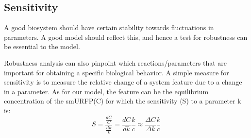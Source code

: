 \subsection{Sensitivity }
A good biosystem should have certain stability towards fluctuations in parameters. A good model should reflect this, and hence a test for robustness can be essential to the model.

Robustness analysis can also pinpoint which reactions/parameters that are important for obtaining a specific biological behavior. A simple measure for sensitivity is to measure the relative change of a system feature due to a change in a parameter. As for our model, the feature can be the equilibrium concentration of the smURFP(C) for which the sensitivity (S) to a parameter k is:
\begin{equation}
	S=\frac{\frac{dC}{C}}{\frac{dk}{k}}=\frac{dC}{dk}\frac{k}{c}\approx \frac{\Delta C}{\Delta k}\frac{k}{c}
\end{equation}
